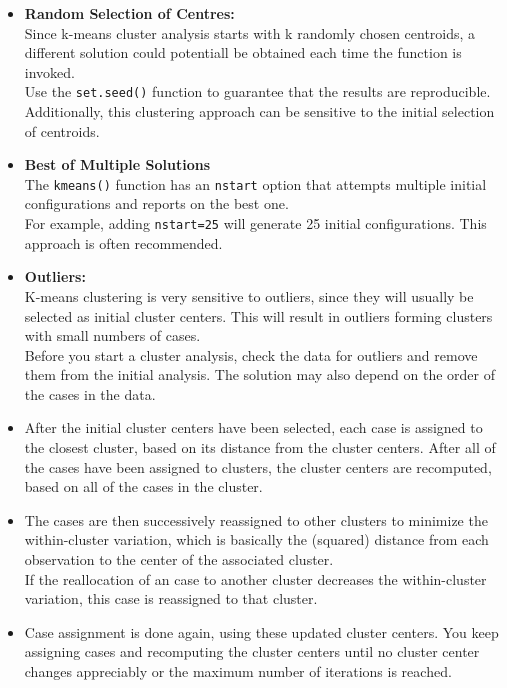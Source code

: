 \documentclass[12pt]{article}
\begin{document}
\begin{itemize}
\item \textbf{Random Selection of Centres: } \\Since k-means cluster analysis starts with k randomly chosen centroids, a different solution could potentiall be obtained each time the function is invoked.\\ Use the \texttt{set.seed()} function to guarantee that the results are reproducible.\\ Additionally, this clustering approach can be sensitive to the initial selection of centroids. 
\bigskip
\item \textbf{Best of Multiple Solutions}\\ The \texttt{kmeans()} function has an \texttt{nstart} option that attempts multiple initial configurations and reports on the best one. \\ For example, adding \texttt{nstart=25} will generate 25 initial configurations. This approach is often recommended.

\newpage

\item \textbf{Outliers:}\\ K-means clustering is very sensitive to outliers, since they will usually be selected as initial cluster centers. This will result in outliers forming clusters with small numbers of cases. \\ Before you start a cluster analysis, check the data for outliers and remove them from the initial analysis. The solution may also depend on the order of the cases in the data.
\item 
After the initial cluster centers have been selected, each case is assigned to the closest
cluster, based on its distance from the cluster centers. After all of the cases have been
assigned to clusters, the cluster centers are recomputed, based on all of the cases in the
cluster.
\item 
The cases are then successively reassigned to other clusters to minimize the within-cluster variation, which is basically the (squared) distance from each observation to the center of the associated cluster. \\ If the reallocation of an case to another cluster decreases the within-cluster variation, this case is reassigned
to that cluster.

\item Case assignment is done again, using these updated cluster centers. You keep
assigning cases and recomputing the cluster centers until no cluster center changes
appreciably or the maximum number of iterations is reached.
\end{itemize}
\newpage
\end{document}
